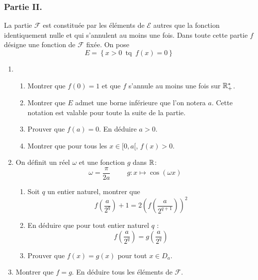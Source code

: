 \subsubsection*{Partie II.}
La partie $\mathcal{F}$ est constituée par les éléments de $\mathcal{E}$ autres que la fonction identiquement nulle et qui s'annulent au moins une fois. Dans toute cette partie $f$ désigne une fonction de $\mathcal{F}$ fixée. On pose 
\[E=\left\{x>0 \,\text{ tq }\, f(x)=0\right\}\]
\begin{enumerate}
\item \begin{enumerate}
\item Montrer que $f(0)=1$ et que $f$ s'annule au moins une fois sur $\mathbb{R}_+^*$.
\item Montrer que $E$ admet une borne inférieure que l'on notera $a$. Cette notation est valable pour toute la suite de la partie. 
\item Prouver que $f(a)=0$. En déduire $a>0$.
\item Montrer que pour tous les $x\in [0,a[$, $f(x)>0$.
\end{enumerate}
\item On définit un réel $\omega$ et une fonction $g$ dans $\mathbb{R}$:
\begin{displaymath}
\omega=\frac{\pi}{2a} \hspace{1cm}g : x\mapsto \cos (\omega x) 
\end{displaymath}

\begin{enumerate}
\item Soit $q$ un entier naturel, montrer que 
\[f(\frac{a}{2^q})+1=2\left(f(\frac{a}{2^{q+1}})\right)^2\]
\item En déduire que pour tout entier naturel $q$ :
\[f(\frac{a}{2^q})=g(\frac{a}{2^q})\]
\item Prouver que $f(x)=g(x)$ pour tout $x\in D_a$.
\end{enumerate}
\item Montrer que $f=g$. En déduire tous les éléments de $\mathcal F$.
\end{enumerate}

